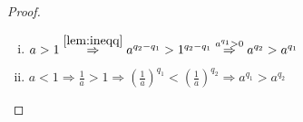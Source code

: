 \begin{proof}
\item {}
  \begin{enumerate}[(i)]
    \item  $ a>1 \overset{\ref{lem:ineqq}}{\Rightarrow} 
      a^{q_{2}- q_{1}} > 1^{q_{2} - q_{1}} \overset{a^{q_{1}}>0}{\Rightarrow} 
      a^{q_{2}} > a^{q_{1} } $

    \item $ a<1 \Rightarrow \frac{1}{a} >1 \Rightarrow 
      (\frac{1}{a} )^{q_{1}} < (\frac{1}{a} )^{q_{2} } \Rightarrow a^{q_{1}} 
      > a^{q_{2}} $
  \end{enumerate}
\end{proof}


